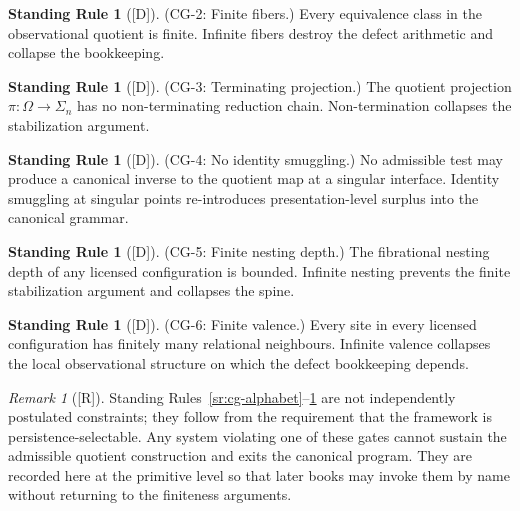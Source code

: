 \documentclass[12pt,oneside]{amsbook}
\theoremstyle{plain}
\theoremstyle{definition}
\newtheorem{standingrule}[theorem]{Standing Rule}
\theoremstyle{remark}
\newtheorem{remark}[theorem]{Remark}
\newcommand{\status}[1]{\textup{[#1]}}
\begin{document}
\begin{standingrule}[\status{D}]\label{sr:cg-fibers}
\textup{(CG-2: Finite fibers.)}
Every equivalence class in the observational quotient is finite.
Infinite fibers destroy the defect arithmetic and collapse the
bookkeeping.
\end{standingrule}

\begin{standingrule}[\status{D}]\label{sr:cg-projection}
\textup{(CG-3: Terminating projection.)}
The quotient projection $\pi: \Omega \to \Sigma_n$ has no
non-terminating reduction chain.  Non-termination collapses
the stabilization argument.
\end{standingrule}

\begin{standingrule}[\status{D}]\label{sr:cg-no-id-smuggle}
\textup{(CG-4: No identity smuggling.)}
No admissible test may produce a canonical inverse to the quotient
map at a singular interface.  Identity smuggling at singular points
re-introduces presentation-level surplus into the canonical grammar.
\end{standingrule}

\begin{standingrule}[\status{D}]\label{sr:cg-nesting}
\textup{(CG-5: Finite nesting depth.)}
The fibrational nesting depth of any licensed configuration is
bounded.  Infinite nesting prevents the finite stabilization argument
and collapses the spine.
\end{standingrule}

\begin{standingrule}[\status{D}]\label{sr:cg-valence}
\textup{(CG-6: Finite valence.)}
Every site in every licensed configuration has finitely many
relational neighbours.  Infinite valence collapses the local
observational structure on which the defect bookkeeping depends.
\end{standingrule}

\begin{remark}[\status{R}]
Standing Rules~\ref{sr:cg-alphabet}--\ref{sr:cg-valence} are not
independently postulated constraints; they follow from the requirement
that the framework is persistence-selectable.  Any system violating one
of these gates cannot sustain the admissible quotient construction and
exits the canonical program.  They are recorded here at the primitive
level so that later books may invoke them by name without returning to
the finiteness arguments.
\end{remark}
\end{document}
